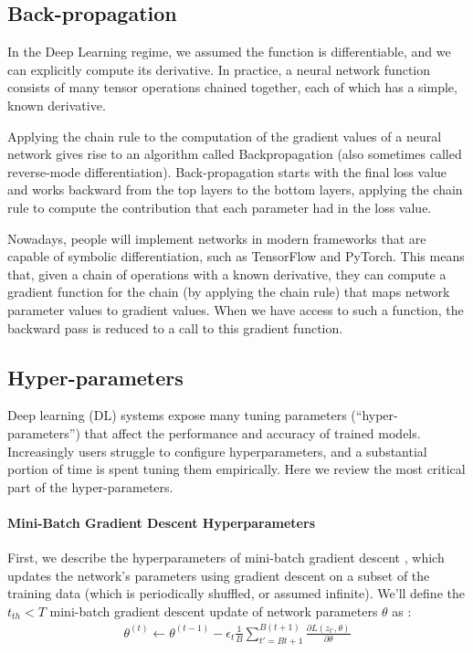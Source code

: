 \documentclass{article}
\begin{document}
\subsection{Back-propagation}
In the Deep Learning regime, we assumed the function is differentiable, and we can explicitly compute its derivative. In practice, a neural network function consists of many tensor operations chained together, each of which has a simple, known derivative.

Applying the chain rule to the computation of the gradient values of a neural network gives rise to an algorithm called Backpropagation (also sometimes called reverse-mode differentiation). Back-propagation starts with the final loss value and works backward from the top layers to the bottom layers, applying the chain rule to compute the contribution that each parameter had in the loss value.

Nowadays, people will implement networks in modern frameworks that are capable of symbolic differentiation, such as TensorFlow \citep{DBLP:journals/corr/AbadiABBCCCDDDG16} and PyTorch. This means that, given a chain of operations with a known derivative, they can compute a gradient function for the chain (by applying the chain rule) that maps network parameter values to gradient values. When we have access to such a function, the backward pass is reduced to a call to this gradient function.

\subsection{Hyper-parameters}
Deep learning (DL) systems expose many tuning parameters (“hyper-parameters”) that affect the performance and accuracy of trained models. Increasingly users struggle to configure hyperparameters, and a substantial portion of time is spent tuning them empirically. Here we review the most critical part of the hyper-parameters.

\paragraph{Mini-Batch Gradient Descent Hyperparameters}
First, we describe the hyperparameters of mini-batch gradient descent \citep{DBLP:journals/corr/abs-1903-04192}, which updates the network's parameters using gradient descent on a subset of the training data (which is periodically shuffled, or assumed infinite). We'll define the $t_{th} < T$ mini-batch gradient descent update of network parameters ${\theta}$ as :
\begin{align}
	\theta^{(t)} \leftarrow \theta^{(t-1)} -\epsilon_t\frac {1}{B}\sum_{t'=Bt+1}^{B(t+1)}\frac{\partial L(z_{t'},\theta)}{\partial \theta }
\end{align}
\end{document}
